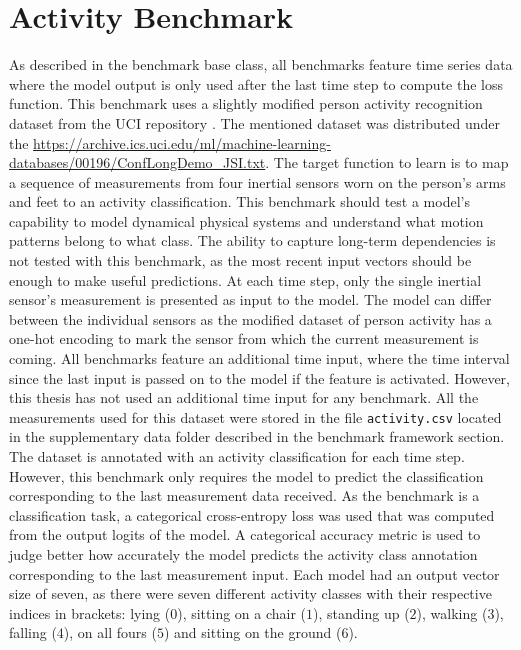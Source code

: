 \documentclass[draft,final]{vutinfth} %
\begin{document}
    \section{Activity Benchmark} \label{activity}
    As described in the benchmark base class, all benchmarks feature time series data where the model output is only used after the last time step to compute the loss function.
    This benchmark uses a slightly modified person activity recognition dataset from the UCI repository \cite{UCI}.
    The mentioned dataset was distributed under the \url{https://archive.ics.uci.edu/ml/machine-learning-databases/00196/ConfLongDemo_JSI.txt}.
    The target function to learn is to map a sequence of measurements from four inertial sensors worn on the person's arms and feet to an activity classification.
    This benchmark should test a model's capability to model dynamical physical systems and understand what motion patterns belong to what class.
    The ability to capture long-term dependencies is not tested with this benchmark, as the most recent input vectors should be enough to make useful predictions.
    At each time step, only the single inertial sensor's measurement is presented as input to the model.
    The model can differ between the individual sensors as the modified dataset of person activity has a one-hot encoding to mark the sensor from which the current measurement is coming.
    All benchmarks feature an additional time input, where the time interval since the last input is passed on to the model if the feature is activated.
    However, this thesis has not used an additional time input for any benchmark.
    All the measurements used for this dataset were stored in the file \texttt{activity.csv} located in the supplementary data folder described in the benchmark framework section.
    The dataset is annotated with an activity classification for each time step. However, this benchmark only requires the model to predict the classification corresponding to the last measurement data received.
    As the benchmark is a classification task, a categorical cross-entropy loss was used that was computed from the output logits of the model.
    A categorical accuracy metric is used to judge better how accurately the model predicts the activity class annotation corresponding to the last measurement input.
    Each model had an output vector size of seven, as there were seven different activity classes with their respective indices in brackets: lying ($0$), sitting on a chair ($1$), standing up ($2$), walking ($3$), falling ($4$), on all fours ($5$) and sitting on the ground ($6$).
\end{document}
